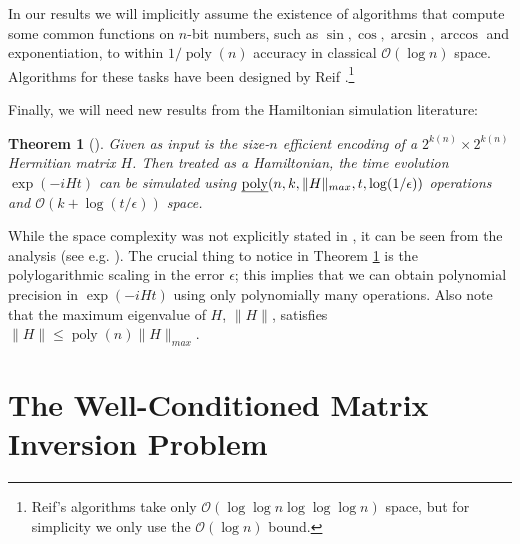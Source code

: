 \documentclass[11pt]{article}
\newtheorem{theorem}{Theorem}
\theoremstyle{definition}
\theoremstyle{remark}
\newcommand\bigoh{\mathcal{O}}
\DeclareMathOperator{\poly}{poly}
\begin{document}
In our results we will implicitly assume the existence of algorithms that compute some common functions on $n$-bit numbers, such as $\sin,\cos,\arcsin,\arccos$ and exponentiation, to within $1/\poly(n)$ accuracy in classical $\bigoh (\log{n})$ space.  Algorithms for these tasks have been designed by Reif \cite{reif}.\footnote{Reif's algorithms take only $\bigoh (\log\log{n}\log\log\log{n})$ space, but for simplicity we only use the $\bigoh (\log{n})$ bound.}

Finally, we will need new results from the Hamiltonian simulation literature:
\begin{theorem}[\cite{berry14,bccks15,berry15}] \label{thm:ham_sim}
Given as input is the size-$n$ efficient encoding of a $2^{k(n)} \times 2^{k(n)}$ Hermitian matrix $H$. Then treated as a Hamiltonian, the time evolution $\exp(-iHt)$ can be simulated using $\text{\emph{poly}}(n,k,\|H\|_{max}, t, \log(1/\epsilon))$ operations and $\bigoh(k+\log(t/\epsilon))$ space.
\end{theorem}
While the space complexity was not explicitly stated in \cite{berry14,bccks15,berry15}, it can be seen from the analysis (see e.g. \cite{bccks15}). The crucial thing to notice in Theorem \ref{thm:ham_sim} is the polylogarithmic scaling in the error $\epsilon$; this implies that we can obtain polynomial precision in $\exp(-iHt)$ using only polynomially many operations. Also note that the maximum eigenvalue of $H$, $\|H\|$, satisfies $\|H\| \le \poly(n) \|H\|_{max}$.


\section{The Well-Conditioned Matrix Inversion Problem} \label{sec: Matrix Inversion}
\end{document}
